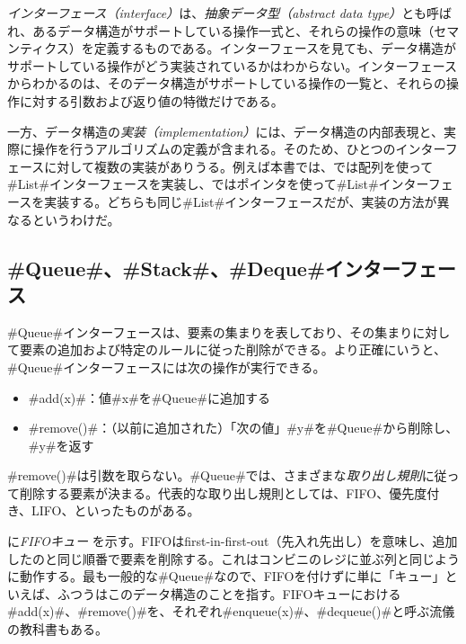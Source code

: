 \emph{インターフェース（interface）}は、\emph{抽象データ型（abstract data type）}とも呼ばれ、あるデータ構造がサポートしている操作一式と、それらの操作の意味（セマンティクス）を定義するものである。インターフェースを見ても、データ構造がサポートしている操作がどう実装されているかはわからない。インターフェースからわかるのは、そのデータ構造がサポートしている操作の一覧と、それらの操作に対する引数および返り値の特徴だけである。 %

一方、データ構造の\emph{実装（implementation）}には、データ構造の内部表現と、実際に操作を行うアルゴリズムの定義が含まれる。そのため、ひとつのインターフェースに対して複数の実装がありうる。例えば本書では、では配列を使って#List#インターフェースを実装し、ではポインタを使って#List#インターフェースを実装する。どちらも同じ#List#インターフェースだが、実装の方法が異なるというわけだ。

\subsection{#Queue#、#Stack#、#Deque#インターフェース}

#Queue#インターフェースは、要素の集まりを表しており、その集まりに対して要素の追加および特定のルールに従った削除ができる。より正確にいうと、#Queue#インターフェースには次の操作が実行できる。

\begin{itemize}
  \item #add(x)#：値#x#を#Queue#に追加する
  \item #remove()#：（以前に追加された）「次の値」#y#を#Queue#から削除し、#y#を返す
\end{itemize}

#remove()#は引数を取らない。#Queue#では、さまざまな\emph{取り出し規則}に従って削除する要素が決まる。代表的な取り出し規則としては、FIFO、優先度付き、LIFO、といったものがある。 %

に\emph{FIFOキュー} を示す。FIFOはfirst-in-first-out（先入れ先出し）を意味し、追加したのと同じ順番で要素を削除する。これはコンビニのレジに並ぶ列と同じように動作する。最も一般的な#Queue#なので、FIFOを付けずに単に「キュー」といえば、ふつうはこのデータ構造のことを指す。FIFOキューにおける#add(x)#、#remove()#を、それぞれ#enqueue(x)#、#dequeue()#と呼ぶ流儀の教科書もある。


